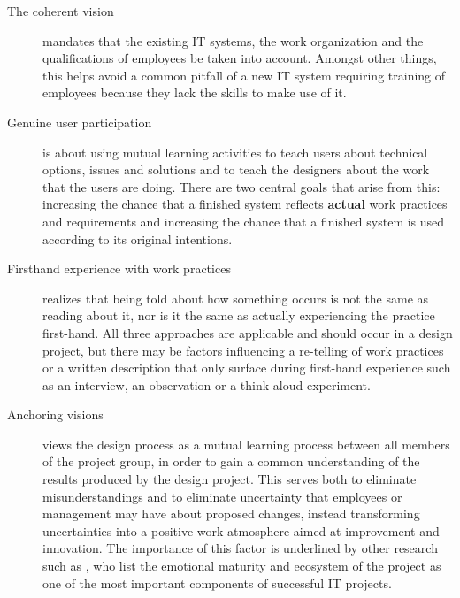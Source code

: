 \begin{description}
    \item [The coherent vision] mandates that the existing IT systems, the work organization 
        and the qualifications of employees be taken into account. Amongst other things, 
        this helps avoid a common pitfall of a new IT system requiring training of employees 
        because they lack the skills to make use of it. 
    \item [Genuine user participation] is about using mutual learning activities
        to teach users about technical options, issues and solutions and to
        teach the designers about the work that the users are doing. There are
        two central goals that arise from this: increasing the chance that a
        finished system reflects \textbf{actual} work practices and
        requirements and increasing the chance that a finished system is used
        according to its original intentions.
    \item [Firsthand experience with work practices] realizes that being told
        about how something occurs is not the same as reading about it, nor is
        it the same as actually experiencing the practice first-hand. All three
        approaches are applicable and should occur in a design project, but
        there may be factors influencing a re-telling of work practices or a
        written description that only surface during first-hand experience such
        as an interview, an observation or a think-aloud experiment.
    \item [Anchoring visions] views the design process as a mutual learning
        process between all members of the project group, in order to gain a
        common understanding of the results produced by the design
        project\cite{bodker2004participatory}. This serves both to eliminate
        misunderstandings and to eliminate uncertainty that employees or management
        may have about proposed changes, instead transforming uncertainties into
        a positive work atmosphere aimed at improvement and innovation. The
        importance of this factor is underlined by other research such as
        \cite{standish20012}, who list the emotional maturity and ecosystem of
        the project as one of the most important components of successful IT
        projects.
\end{description}

